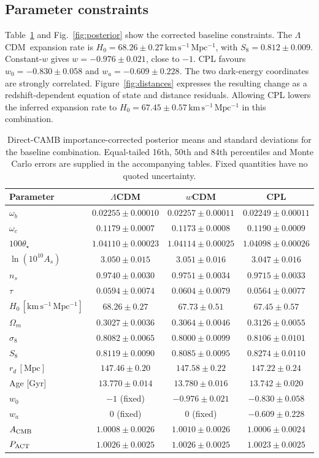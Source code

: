 \documentclass[fleqn,usenatbib]{mnras}
\newcommand{\lcdm}{$\Lambda$CDM}
\newcommand{\hunit}{\mathrm{km\,s^{-1}\,Mpc^{-1}}}
\begin{document}
\subsection{Parameter constraints}
Table~\ref{tab:params} and Fig.~\ref{fig:posterior} show the corrected baseline constraints. The \lcdm\ expansion rate is $H_0=68.26\pm0.27\,\hunit$, with $S_8=0.812\pm0.009$. Constant-$w$ gives $w=-0.976\pm0.021$, close to $-1$. CPL favours $w_0=-0.830\pm0.058$ and $w_a=-0.609\pm0.228$. The two dark-energy coordinates are strongly correlated. Figure~\ref{fig:distances} expresses the resulting change as a redshift-dependent equation of state and distance residuals. Allowing CPL lowers the inferred expansion rate to $H_0=67.45\pm0.57\,\hunit$ in this combination.
\begin{table}\centering
\caption{Direct-CAMB importance-corrected posterior means and standard deviations for the baseline combination. Equal-tailed 16th, 50th and 84th percentiles and Monte Carlo errors are supplied in the accompanying tables. Fixed quantities have no quoted uncertainty.}\label{tab:params}
\begin{tabular}{lccc}\toprule
Parameter & $\Lambda$CDM & $w$CDM & CPL\\\midrule
$\omega_b$ & $0.02255\pm0.00010$ & $0.02257\pm0.00011$ & $0.02249\pm0.00011$\\
$\omega_c$ & $0.1179\pm0.0007$ & $0.1173\pm0.0008$ & $0.1190\pm0.0009$\\
$100\theta_\star$ & $1.04110\pm0.00023$ & $1.04114\pm0.00025$ & $1.04098\pm0.00026$\\
$\ln(10^{10}A_s)$ & $3.050\pm0.015$ & $3.051\pm0.016$ & $3.047\pm0.016$\\
$n_s$ & $0.9740\pm0.0030$ & $0.9751\pm0.0034$ & $0.9715\pm0.0033$\\
$\tau$ & $0.0594\pm0.0074$ & $0.0604\pm0.0079$ & $0.0564\pm0.0077$\\
$H_0\,[\hunit]$ & $68.26\pm0.27$ & $67.73\pm0.51$ & $67.45\pm0.57$\\
$\Omega_m$ & $0.3027\pm0.0036$ & $0.3064\pm0.0046$ & $0.3126\pm0.0055$\\
$\sigma_8$ & $0.8082\pm0.0065$ & $0.8000\pm0.0099$ & $0.8106\pm0.0101$\\
$S_8$ & $0.8119\pm0.0090$ & $0.8085\pm0.0095$ & $0.8274\pm0.0110$\\
$r_d\,[\mathrm{Mpc}]$ & $147.46\pm0.20$ & $147.58\pm0.22$ & $147.22\pm0.24$\\
Age [Gyr] & $13.770\pm0.014$ & $13.780\pm0.016$ & $13.742\pm0.020$\\
$w_0$ & $-1$ (fixed) & $-0.976\pm0.021$ & $-0.830\pm0.058$\\
$w_a$ & $0$ (fixed) & $0$ (fixed) & $-0.609\pm0.228$\\
$A_{\rm CMB}$ & $1.0008\pm0.0026$ & $1.0010\pm0.0026$ & $1.0006\pm0.0024$\\
$P_{\rm ACT}$ & $1.0026\pm0.0025$ & $1.0026\pm0.0025$ & $1.0023\pm0.0025$\\
\bottomrule\end{tabular}
\end{table}
\end{document}
